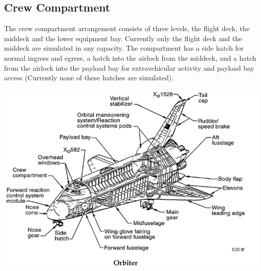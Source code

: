 \documentclass[13pt, letter,final]{article}
\begin{document}
\begin{multicols}{2}
\begin{center}
\subsection*{Crew Compartment}
\end{center}
The crew compartment arrangement consists of three levels, the flight deck, the middeck and the lower equipment bay. Currently only the flight deck and the middeck are simulated in any capacity. The compartment has a side hatch for normal ingress and egress, a hatch into the airlock from the middeck, and a hatch from the airlock into the payload bay for extravehicular activity and payload bay access (Currently none of these hatches are simulated).

\end{multicols}
\includegraphics[width=1\textwidth]{Orbiter.jpg}
\begin{multicols}{2}


\end{multicols}

\newpage

\newpage

\newpage

\newpage

\end{document}
